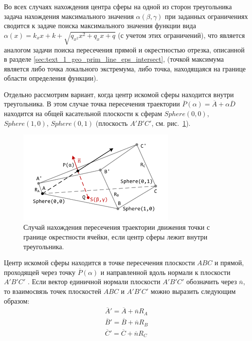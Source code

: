 Во всех случаях нахождения центра сферы на одной из сторон треугольника задача нахождения максимального значения $\alpha(\beta, \gamma)$ при заданных ограничениях сводится к задаче поиска максимального значения функции вида $\alpha(x) = k_x x + k + \sqrt{q_{x^2} x^2 + q_x x + q}$ (с учетом этих ограничений), что является аналогом задачи поиска пересечения прямой и окрестностью отрезка, описанной в разделе \ref{sec:text_1_geo_prim_line_eps_intersect}, (точкой максимума является либо точка локального экстремума, либо точка, находящаяся на границе области определения функции).

Отдельно рассмотрим вариант, когда центр искомой сферы находится внутри треугольника.
В этом случае точка пересечения траектории $\overline{P}(\alpha) = \overline{A} + \alpha \overline{D}$ находится на общей касательной плоскости к сферам $Sphere(0,0)$, $Sphere(1,0)$, $Sphere(0,1)$ (плоскость $A'B'C'$, см. рис.~\ref{fig:text_1_remesh_common_envelope_3}).

\begin{figure}[ht]
\centering
\includegraphics[width=0.7\textwidth]{./pics/text_1_remesh_common_envelope/case1.pdf}
\singlespacing
{}\caption{Случай нахождения пересечения траектории движения точки с границе окрестности ячейки, если центр сферы лежит внутри треугольника.}
\label{fig:text_1_remesh_common_envelope_3}
\end{figure}

Центр искомой сферы находится в точке пересечения плоскости $ABC$ и прямой, проходящей через точку $\overline{P}(\alpha)$ и направленной вдоль нормали к плоскости $A'B'C'$ .
Если вектор единичной нормали плоскости $A'B'C'$ обозначить через $\overline{n}$, то взаимосвязь точек плоскостей $ABC$ и $A'B'C'$ можно выразить следующим образом:
\begin{equation}
	\begin{aligned}
		\overline{A}' = \overline{A} + \overline{n}R_A \\
		\overline{B}' = \overline{B} + \overline{n}R_B \\
		\overline{C}' = \overline{C} + \overline{n}R_C
	\end{aligned}
\end{equation}

